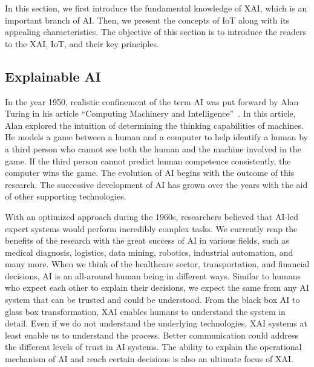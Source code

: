 \documentclass[journal]{IEEEtran}
\begin{document}
In this section, we first introduce the fundamental knowledge of XAI, which is an important branch of AI. Then, we present the concepts of IoT along with its appealing characteristics. The objective of this section is to introduce the readers to the XAI, IoT, and their key principles.

\subsection{Explainable AI} 
In the year 1950, realistic confinement of the term AI was put forward by Alan Turing in his article ``Computing Machinery and Intelligence''~\cite{turing2009computing}. In this article, Alan explored the intuition of determining the thinking capabilities of machines. He models a game between a human and a computer to help identify a human by a third person who cannot see both the human and the machine involved in the game. If the third person cannot predict human competence consistently, the computer wins the game. The evolution of AI begins with the outcome of this research. The successive development of AI has grown over the years with the aid of other supporting technologies.  

With an optimized approach during the 1960s, researchers believed that AI-led expert systems would perform incredibly complex tasks. We currently reap the benefits of the research with the great success of AI in various fields, such as medical diagnosis, logistics, data mining, robotics, industrial automation, and many more. When we think of the healthcare sector, transportation, and financial decisions, AI is an all-around human being in different ways. Similar to humans who expect each other to explain their decisions, we expect the same from any AI system that can be trusted and could be understood. From the black box AI to glass box transformation, XAI enables humans to understand the system in detail. Even if we do not understand the underlying technologies, XAI systems at least enable us to understand the process. Better communication could address the different levels of trust in AI systems. The ability to explain the operational mechanism of AI and reach certain decisions is also an ultimate focus of XAI.  
\end{document}
